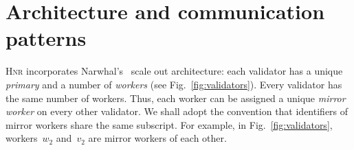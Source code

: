 \documentclass[%
dvipsnames
]{article}
\theoremstyle{definition}
\newcommand{\Hnr}{\textsc{Hnr}\xspace}
\newcommand{\fig}[1][]{Fig.~}
\begin{document}





\section{Architecture and communication patterns}
\label{sec:communication-patterns}
 \Hnr incorporates Narwhal's~\cite{NT}
 scale out architecture: %
 each validator has a unique \emph{primary} and %
 a number of \emph{workers} %
 (see \fig\ref{fig:validators}).
 Every validator has the same number of workers.
 Thus,
 each worker can be assigned a unique \emph{mirror worker}
 on every other validator.
 We shall adopt the convention
 that  identifiers of mirror workers share the same subscript.
 For example,
 in \fig\ref{fig:validators},
 workers~\(w_2\) and~\(v_2\) are mirror workers of each other.
\end{document}
